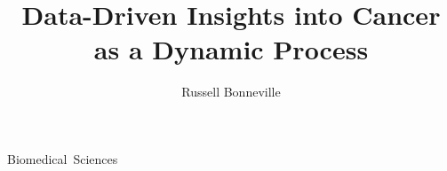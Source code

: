 \documentclass{osudissert96}
\begin{document}
%
%

\author{Russell Bonneville}
\title{Data-Driven Insights into Cancer as a Dynamic Process}
\unit{Biomedical Sciences}


%
%

\maketitle

%
%
%
%
%

\disscopyright

%
%

\begin{abstract}
  
\end{abstract}


%
%
%
\end{document}
